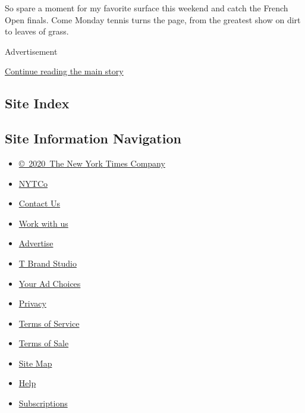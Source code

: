 So spare a moment for my favorite surface this weekend and catch the
French Open finals. Come Monday tennis turns the page, from the greatest
show on dirt to leaves of grass.

Advertisement

\protect\hyperlink{after-bottom}{Continue reading the main story}

\hypertarget{site-index}{%
\subsection{Site Index}\label{site-index}}

\hypertarget{site-information-navigation}{%
\subsection{Site Information
Navigation}\label{site-information-navigation}}

\begin{itemize}
\tightlist
\item
  \href{https://help.nytimes.com/hc/en-us/articles/115014792127-Copyright-notice}{©~2020~The
  New York Times Company}
\end{itemize}

\begin{itemize}
\tightlist
\item
  \href{https://www.nytco.com/}{NYTCo}
\item
  \href{https://help.nytimes.com/hc/en-us/articles/115015385887-Contact-Us}{Contact
  Us}
\item
  \href{https://www.nytco.com/careers/}{Work with us}
\item
  \href{https://nytmediakit.com/}{Advertise}
\item
  \href{http://www.tbrandstudio.com/}{T Brand Studio}
\item
  \href{https://www.nytimes.com/privacy/cookie-policy\#how-do-i-manage-trackers}{Your
  Ad Choices}
\item
  \href{https://www.nytimes.com/privacy}{Privacy}
\item
  \href{https://help.nytimes.com/hc/en-us/articles/115014893428-Terms-of-service}{Terms
  of Service}
\item
  \href{https://help.nytimes.com/hc/en-us/articles/115014893968-Terms-of-sale}{Terms
  of Sale}
\item
  \href{https://spiderbites.nytimes.com}{Site Map}
\item
  \href{https://help.nytimes.com/hc/en-us}{Help}
\item
  \href{https://www.nytimes.com/subscription?campaignId=37WXW}{Subscriptions}
\end{itemize}
